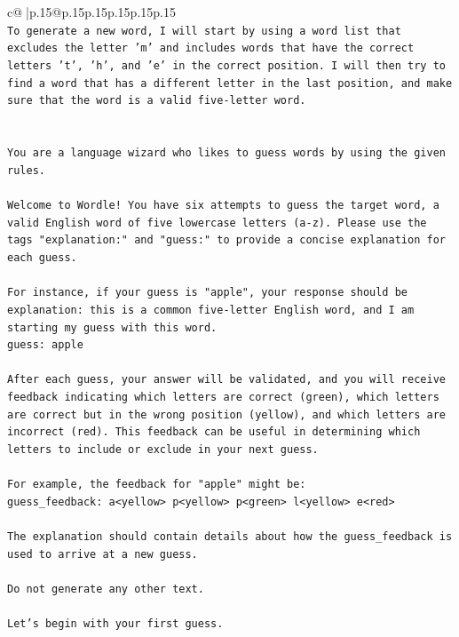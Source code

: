 \documentclass{article}
\begin{document}
{\begin{supertabular}{c@{$\;$}|p{.15\linewidth}@{}p{.15\linewidth}p{.15\linewidth}p{.15\linewidth}p{.15\linewidth}p{.15\linewidth}}
{{{\\ 
\texttt{To generate a new word, I will start by using a word list that excludes the letter 'm' and includes words that have the correct letters 't', 'h', and 'e' in the correct position. I will then try to find a word that has a different letter in the last position, and make sure that the word is a valid five{-}letter word.} \\
\\ 
\\ 
\texttt{You are a language wizard who likes to guess words by using the given rules.} \\
\\ 
\texttt{Welcome to Wordle! You have six attempts to guess the target word, a valid English word of five lowercase letters (a{-}z). Please use the tags "explanation:" and "guess:" to provide a concise explanation for each guess.} \\
\\ 
\texttt{For instance, if your guess is "apple", your response should be} \\
\texttt{explanation: this is a common five{-}letter English word, and I am starting my guess with this word.} \\
\texttt{guess: apple} \\
\\ 
\texttt{After each guess, your answer will be validated, and you will receive feedback indicating which letters are correct (green), which letters are correct but in the wrong position (yellow), and which letters are incorrect (red). This feedback can be useful in determining which letters to include or exclude in your next guess.} \\
\\ 
\texttt{For example, the feedback for "apple" might be:} \\
\texttt{guess\_feedback: a<yellow> p<yellow> p<green> l<yellow> e<red>} \\
\\ 
\texttt{The explanation should contain details about how the guess\_feedback is used to arrive at a new guess.} \\
\\ 
\texttt{Do not generate any other text.} \\
\\ 
\texttt{Let's begin with your first guess.} \\
            }
        }
    }
     \\ \\


\end{supertabular}}
\end{document}
